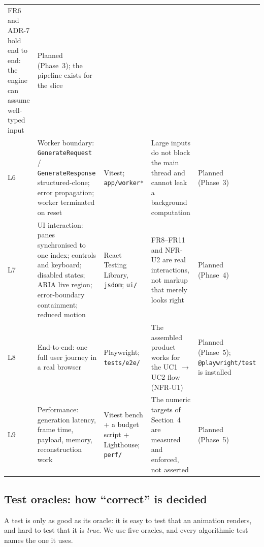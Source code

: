 \documentclass[11pt,a4paper]{article}
\newcommand{\ct}[1]{\texttt{#1}}
\begin{document}
{\begin{longtable}{@{}L{0.9cm}L{3.2cm}L{3.5cm}L{3.9cm}L{3.2cm}@{}}
FR6 and ADR-7 hold end to end: the engine can assume well-typed input &
Planned (Phase~3); the pipeline exists for the slice \\
L6 & Worker boundary: \ct{GenerateRequest} / \ct{GenerateResponse} structured-clone; error
propagation; worker terminated on reset & Vitest; \ct{app/worker*} &
Large inputs do not block the main thread and cannot leak a background computation &
Planned (Phase~3) \\
L7 & UI interaction: panes synchronised to one index; controls and keyboard; disabled states;
ARIA live region; error-boundary containment; reduced motion & React Testing Library,
\ct{jsdom}; \ct{ui/} & FR8--FR11 and NFR-U2 are real interactions, not markup that merely
looks right & Planned (Phase~4) \\
L8 & End-to-end: one full user journey in a real browser & Playwright; \ct{tests/e2e/} &
The assembled product works for the UC1 $\to$ UC2 flow (NFR-U1) &
Planned (Phase~5); \ct{@playwright/test} is installed \\
L9 & Performance: generation latency, frame time, payload, memory, reconstruction work &
Vitest bench + a budget script + Lighthouse; \ct{perf/} &
The numeric targets of Section~4 are measured and enforced, not asserted &
Planned (Phase~5) \\
\end{longtable}
}

\subsection{Test oracles: how ``correct'' is decided}

A test is only as good as its oracle: it is easy to test that an animation renders, and hard to
test that it is \emph{true}. We use five oracles, and every algorithmic test names the one it
uses.
\end{document}

